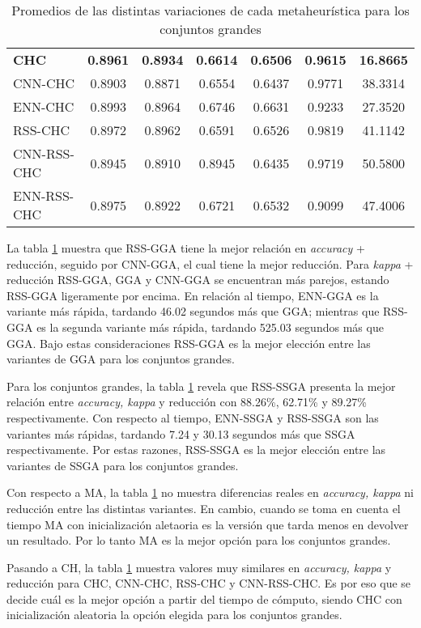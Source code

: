 \begin{table}[h!]
\begin{tabular}{l c c c c c c}
\hline

\textbf{CHC}  & \textbf{0.8961} & \textbf{0.8934} & \textbf{0.6614} & \textbf{0.6506} & \textbf{0.9615} & \textbf{16.8665} \\
CNN-CHC & 0.8903 & 0.8871 & 0.6554 & 0.6437 & 0.9771 & 38.3314 \\
ENN-CHC & 0.8993 & 0.8964 & 0.6746 & 0.6631 & 0.9233 & 27.3520 \\
RSS-CHC & 0.8972 & 0.8962 & 0.6591 & 0.6526 & 0.9819 & 41.1142 \\
CNN-RSS-CHC & 0.8945 & 0.8910 & 0.8945 & 0.6435 & 0.9719 & 50.5800 \\
ENN-RSS-CHC & 0.8975 & 0.8922 & 0.6721 & 0.6532 & 0.9099 & 47.4006 \\

\hline
\end{tabular}
\caption{Promedios de las distintas variaciones de cada metaheurística para los conjuntos grandes}
\label{grande-all}
\end{table}

La tabla \ref{grande-all} muestra que RSS-GGA tiene la mejor relación en \emph{accuracy} + reducción, seguido por CNN-GGA, el cual tiene la mejor reducción. Para \emph{kappa} + reducción RSS-GGA, GGA y CNN-GGA se encuentran más parejos, estando RSS-GGA ligeramente por encima. En relación al tiempo, ENN-GGA es la variante más rápida, tardando 46.02 segundos más que GGA; mientras que RSS-GGA es la segunda variante más rápida, tardando 525.03 segundos más que GGA. Bajo estas consideraciones RSS-GGA es la mejor elección entre las variantes de GGA para los conjuntos grandes.

Para los conjuntos grandes, la tabla \ref{grande-all} revela que RSS-SSGA presenta la mejor relación entre \emph{accuracy, kappa} y reducción con 88.26\%, 62.71\% y 89.27\% respectivamente. Con respecto al tiempo, ENN-SSGA y RSS-SSGA son las variantes más rápidas, tardando 7.24 y 30.13 segundos más que SSGA respectivamente. Por estas razones, RSS-SSGA es la mejor elección entre las variantes de SSGA para los conjuntos grandes.

Con respecto a MA, la tabla \ref{grande-all} no muestra diferencias reales en \emph{accuracy, kappa} ni reducción entre las distintas variantes. En cambio, cuando se toma en cuenta el tiempo MA con inicialización aletaoria es la versión que tarda menos en devolver un resultado. Por lo tanto MA es la mejor opción para los conjuntos grandes.

Pasando a CH, la tabla \ref{grande-all} muestra valores muy similares en \emph{accuracy, kappa} y reducción para CHC, CNN-CHC, RSS-CHC y CNN-RSS-CHC. Es por eso que se decide cuál es la mejor opción a partir del tiempo de cómputo, siendo CHC con inicialización aleatoria la opción elegida para los conjuntos grandes.

